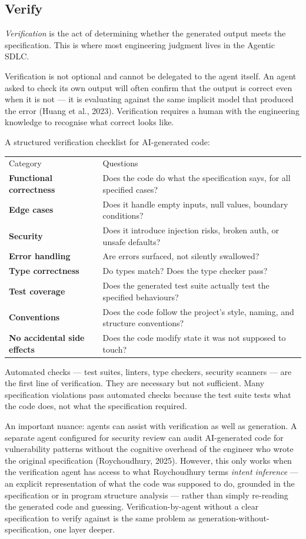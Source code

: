\documentclass[11pt,a4paper]{book}
\begin{document}
\subsection{Verify}

\textit{Verification} is the act of determining whether the generated output meets the specification. This is where most engineering judgment lives in the Agentic SDLC.

Verification is not optional and cannot be delegated to the agent itself. An agent asked to check its own output will often confirm that the output is correct even when it is not --- it is evaluating against the same implicit model that produced the error (Huang et al., 2023). Verification requires a human with the engineering knowledge to recognise what correct looks like.

A structured verification checklist for AI-generated code:

\begin{tabular}{ll}
\hline
Category & Questions \\
\textbf{Functional correctness} & Does the code do what the specification says, for all specified cases? \\
\textbf{Edge cases} & Does it handle empty inputs, null values, boundary conditions? \\
\textbf{Security} & Does it introduce injection risks, broken auth, or unsafe defaults? \\
\textbf{Error handling} & Are errors surfaced, not silently swallowed? \\
\textbf{Type correctness} & Do types match? Does the type checker pass? \\
\textbf{Test coverage} & Does the generated test suite actually test the specified behaviours? \\
\textbf{Conventions} & Does the code follow the project's style, naming, and structure conventions? \\
\textbf{No accidental side effects} & Does the code modify state it was not supposed to touch? \\
\hline
\end{tabular}

Automated checks --- test suites, linters, type checkers, security scanners --- are the first line of verification. They are necessary but not sufficient. Many specification violations pass automated checks because the test suite tests what the code does, not what the specification required.

An important nuance: agents can assist with verification as well as generation. A separate agent configured for security review can audit AI-generated code for vulnerability patterns without the cognitive overhead of the engineer who wrote the original specification (Roychoudhury, 2025). However, this only works when the verification agent has access to what Roychoudhury terms \textit{intent inference} --- an explicit representation of what the code was supposed to do, grounded in the specification or in program structure analysis --- rather than simply re-reading the generated code and guessing. Verification-by-agent without a clear specification to verify against is the same problem as generation-without-specification, one layer deeper.
\end{document}
